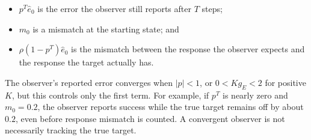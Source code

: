 \begin{itemize}
  \item $p^T\widehat e_0$ is the error the observer still reports after $T$
  steps;
  \item $m_0$ is a mismatch at the starting state; and
  \item $\rho(1-p^T)\widehat e_0$ is the mismatch between the response the
  observer expects and the response the target actually has.
\end{itemize}

The observer's reported error converges when $|p|<1$, or $0<Kg_E<2$ for
positive $K$, but this controls only the first term. For example, if $p^T$ is
nearly zero and $m_0=0.2$, the observer reports success while the true target
remains off by about $0.2$, even before response mismatch is counted. A
convergent observer is not necessarily tracking the true target.
